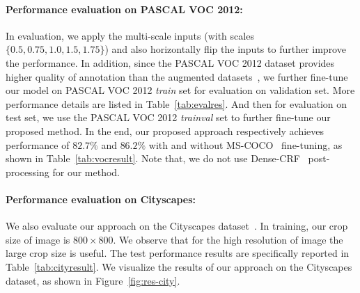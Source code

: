 \documentclass[10pt,twocolumn,letterpaper]{article}
\begin{document}
\vspace{-2ex}    
\paragraph{Performance evaluation on PASCAL VOC 2012:} In evaluation, we apply the multi-scale inputs (with scales $\{0.5, 0.75, 1.0, 1.5, 1.75\}$) and also horizontally flip the inputs to further improve the performance. In addition, since the PASCAL VOC 2012 dataset provides higher quality of annotation than the augmented datasets~\cite{Hariharan-SBD-2011}, we further fine-tune our model on PASCAL VOC 2012 \textit{train} set for evaluation on validation set. More performance details are listed in Table~\ref{tab:evalres}. And then for evaluation on test set, we use the PASCAL VOC 2012 \textit{trainval} set to further fine-tune our proposed method. In the end, our proposed approach respectively achieves performance of $82.7\%$ and $86.2\%$ with and without MS-COCO~\cite{Lin-COCO-2014} fine-tuning, as shown in Table~\ref{tab:vocresult}. Note that, we do not use Dense-CRF~\cite{Chen-ICLR-Deeplab-2016} post-processing for our method.

\vspace{-2ex}    
\paragraph{Performance evaluation on Cityscapes:} We also evaluate our approach on the Cityscapes dataset~\cite{Cityscapes}. In training, our crop size of image is $800\times800$. We observe that for the high resolution of image the large crop size is useful. The test performance results are specifically reported in Table~\ref{tab:cityresult}. We visualize the results of our approach on the Cityscapes dataset, as shown in Figure~\ref{fig:res-city}.
\end{document}
